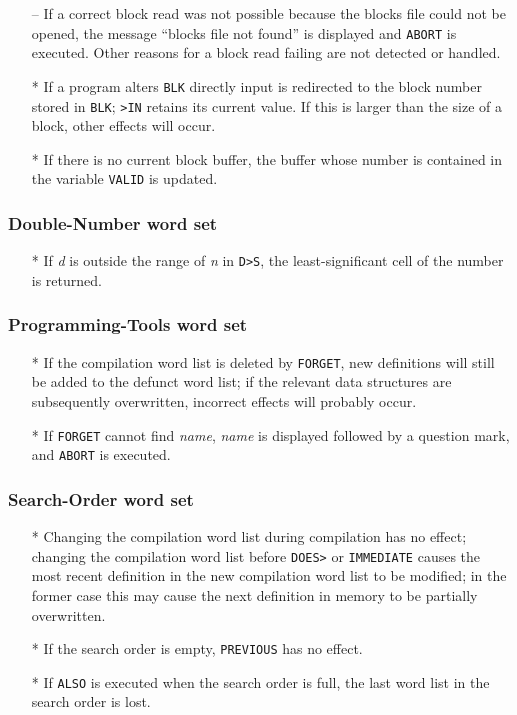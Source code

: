 \documentclass[english]{article}
\newcommand{\spic}[1]{{\it #1\/}}
\begin{document}
\begin{itemize}
\item[--]If a correct block read was not possible because the blocks file could not be opened, the message ``blocks file not found'' is displayed and {\tt ABORT} is executed. Other reasons for a block read failing are not detected or handled.
\item[*]If a program alters {\tt BLK} directly input is redirected to the block number stored in {\tt BLK}; {\tt >IN} retains its current value. If this is larger than the size of a block, other effects will occur.
\item[*]If there is no current block buffer, the buffer whose number is contained in the variable {\tt VALID} is updated.
\end{itemize}

\subsubsection{Double-Number word set}

\begin{itemize}
\item[*]If \spic{d} is outside the range of \spic{n} in {\tt D>S}, the least-significant cell of the number is returned.
\end{itemize}

\subsubsection{Programming-Tools word set}

\begin{itemize}
\item[*]If the compilation word list is deleted by {\tt FORGET}, new definitions will still be added to the defunct word list; if the relevant data structures are subsequently overwritten, incorrect effects will probably occur.
\item[*]If {\tt FORGET} cannot find \textit{name}, \textit{name} is displayed followed by a question mark, and {\tt ABORT} is executed.
\end{itemize}

\subsubsection{Search-Order word set}
\begin{itemize}
\item[*]Changing the compilation word list during compilation has no effect; changing the compilation word list before {\tt DOES>} or {\tt IMMEDIATE} causes the most recent definition in the new compilation word list to be modified; in the former case this may cause the next definition in memory to be partially overwritten.
\item[*]If the search order is empty, {\tt PREVIOUS} has no effect.
\item[*]If {\tt ALSO} is executed when the search order is full, the last word list in the search order is lost.
\end{itemize}
\end{document}
